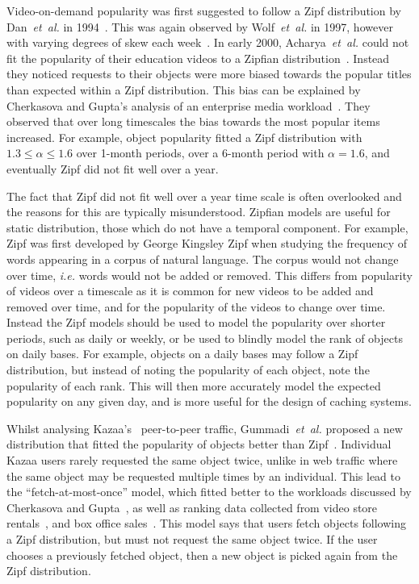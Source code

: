    Video-on-demand popularity was first suggested to follow a Zipf distribution by Dan~\emph{et~al.} in 1994~\cite{dan1994spf}. This was again observed by Wolf~\emph{et~al.} in 1997, however with varying degrees of skew each week~\cite{griwodz1997ltm}. In early 2000, Acharya~\emph{et~al.} could not fit the popularity of their education videos to a Zipfian distribution~\cite{acharya2000cua}. Instead they noticed requests to their objects were more biased towards the popular titles than expected within a Zipf distribution. This bias can be explained by Cherkasova and Gupta's analysis of an enterprise media workload~\cite{cherkasova2002cle}. They observed that over long timescales the bias towards the most popular items increased. For example, object popularity fitted a Zipf distribution with $1.3 \leq \alpha \leq 1.6$ over 1-month periods, over a 6-month period with $\alpha=1.6$, and eventually Zipf did not fit well over a year.

    The fact that Zipf did not fit well over a year time scale is often overlooked and the reasons for this are typically misunderstood. Zipfian models are useful for static distribution, those which do not have a temporal component. For example, Zipf was first developed by George Kingsley Zipf when studying the frequency of words appearing in a corpus of natural language. The corpus would not change over time, \emph{i.e.} words would not be added or removed. This differs from popularity of videos over a timescale as it is common for new videos to be added and removed over time, and for the popularity of the videos to change over time. Instead the Zipf models should be used to model the popularity over shorter periods, such as daily or weekly, or be used to blindly model the rank of objects on daily bases. For example, objects on a daily bases may follow a Zipf distribution, but instead of noting the popularity of each object, note the popularity of each rank. This will then more accurately model the expected popularity on any given day, and is more useful for the design of caching systems.


    Whilst analysing Kazaa's~\cite{kazaa} peer-to-peer traffic, Gummadi~\emph{et~al.} proposed a new distribution that fitted the popularity of objects better than Zipf~\cite{gummadi2003mma}. Individual Kazaa users rarely requested the same object twice, unlike in web traffic where the same object may be requested multiple times by an individual. This lead to the ``fetch-at-most-once'' model, which fitted better to the workloads discussed by Cherkasova and Gupta~\cite{cherkasova2002cle}, as well as ranking data collected from video store rentals~\cite{vsm}, and box office sales~\cite{imdb}. This model says that users fetch objects following a Zipf distribution, but must not request the same object twice. If the user chooses a previously fetched object, then a new object is picked again from the Zipf distribution.

